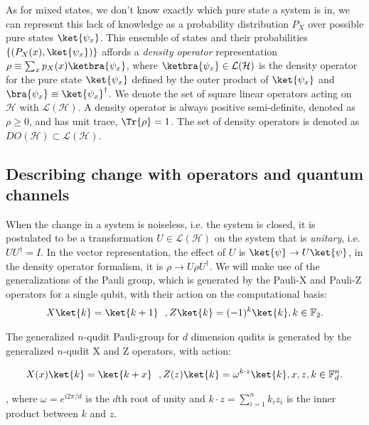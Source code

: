 As for mixed states, we don't know exactly which pure state a system is in, we can represent this lack of knowledge as a probability distribution $P_X$ over possible pure states $\ket{\psi_x}$. This ensemble of states and their probabilities $\{(P_X(x), \ket{\psi_x})\}$ affords a \textit{density operator} representation $\rho \equiv \sum_x p_X(x) \ketbra{\psi_x}$, where $\ketbra{\psi_x} \in \mathcal{L}(\mathcal{H})$ is the density operator for the pure state $\ket{\psi_x}$ defined by the outer product of $\ket{\psi_x}$ and $\bra{\psi_x} \equiv \ket{\psi_x}^\dagger$. We denote the set of square linear operators acting on $\mathcal{H}$ with $\mathcal{L}(\mathcal{H})$. A density operator is always positive semi-definite, denoted as $\rho \geq 0$,  and has unit trace, $\Tr\{\rho\}=1$. The set of density operators is denoted as $DO(\mathcal{H}) \subset \mathcal{L}(\mathcal{H})$. 

\subsection{Describing change with operators and quantum channels} 

When the change in a system is noiseless, i.e. the system is closed, it is postulated to be a transformation $U \in \mathcal{L}(\mathcal{H})$ on the system that is \textit{unitary}, i.e. $UU^\dagger=I$. In the vector representation, the effect of $U$ is $\ket{\psi} \rightarrow U\ket{\psi}$, in the density operator formalism, it is $\rho \rightarrow U \rho U^\dagger$. We will make use of the generalizations of the Pauli group, which is generated by the Pauli-X and Pauli-Z operators for a single qubit, with their action on the computational basis:  
\begin{align}
X\ket{k}=\ket{k+1} \ \ ,  Z\ket{k}=(-1)^{k}\ket{k}, k\in \mathbb{F}_2.
\end{align}

The generalized $n$-qudit Pauli-group for $d$ dimension qudits is generated by the generalized $n$-qudit X and Z operators, with action: 

\begin{align}
X(x)\ket{k}=\ket{k+x} \ \ ,  Z(z)\ket{k}=\omega^{k \cdot z}\ket{k}, x,z,k\in \mathbb{F}_d^n.
\end{align}

, where $\omega = e^{i2\pi/d}$ is the $d$th root of unity and $k \cdot z = \sum_{i=1}^{n} k_i z_i$ is the inner product between $k$ and $z$.  


